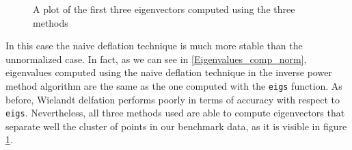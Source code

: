 \begin{figure}[H]
    \caption{A plot of the first three eigenvectors computed using the three methods}
    \label{Eigenvectors_comp_norm}
\end{figure}

\noindent In this case the naive deflation technique is much more stable than the unnormalized case. In fact, as we can see in \ref{Eigenvalues_comp_norm}, eigenvalues computed using the naive deflation technique in the inverse power method algorithm are the same as the one computed with the \texttt{eigs} function. As before, Wielandt delfation performs poorly in terms of accuracy with respect to \texttt{eigs}. Nevertheless, all three methods used are able to compute eigenvectors that separate well the cluster of points in our benchmark data, as it is visible in figure \ref{Eigenvectors_comp_norm}. 